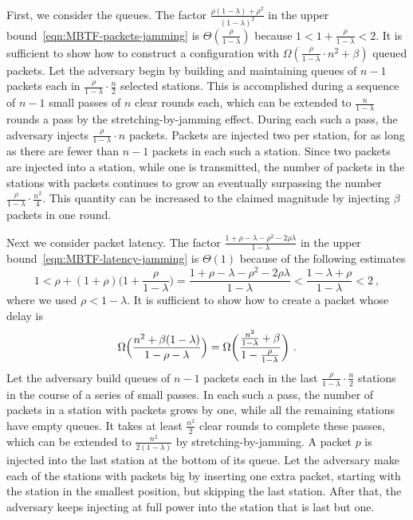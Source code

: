 \documentclass[11pt]{article}
\begin{document}
First, we consider the queues.
The factor $\frac{\rho(1-\lambda)+\rho^2 }{(1-\lambda)^2}$ in the upper bound~\eqref{eqn:MBTF-packets-jamming} is $\Theta(\frac{\rho}{1-\lambda})$ because $1<1+\frac{\rho}{1-\lambda}< 2$.
It is sufficient to show how to construct a configuration with $\Omega(\frac{\rho  }{1-\lambda}\cdot n^2 + \beta)$ queued packets.
Let the adversary begin by building and maintaining queues of $n-1$ packets each in $\frac{\rho}{1-\lambda}\cdot \frac{n}{2}$ selected stations.
This is accomplished during a sequence of $n-1$ small passes of $n$ clear rounds each, which can be extended to $\frac{n}{1-\lambda}$ rounds a pass by the stretching-by-jamming effect.
During each such a pass, the adversary injects $\frac{\rho }{1-\lambda}\cdot n$ packets.
Packets are injected two per station, for as long as there are fewer than $n-1$ packets in each such a station.
Since two packets are injected into a station, while one is transmitted, the number of packets in the stations with packets continues to grow an eventually surpassing the number $\frac{\rho }{1-\lambda}\cdot \frac{n^2}{4}$.
This quantity can be increased to the claimed magnitude by injecting $\beta$ packets in one round.


Next we consider packet latency.
The factor $\frac{1+\rho-\lambda -\rho^2-2\rho\lambda}{1-\lambda}$ in the upper bound~\eqref{eqn:MBTF-latency-jamming} is $\Theta(1)$ because of the following estimates
\[
1
<
\rho+(1+\rho)\bigl(1+\frac{\rho}{1-\lambda}\bigr)
=
\frac{1+\rho-\lambda -\rho^2-2\rho\lambda}{1-\lambda}
<
\frac{1-\lambda +\rho}{1-\lambda} <2
\ ,
\]
where we used $\rho<1-\lambda$.
It is sufficient to show how to create a packet whose delay is  
\[
\Omega\Bigl( \frac{n^2 + \beta(1-\lambda)}{1-\rho-\lambda} \Bigr) = \Omega\biggl(\frac{\frac{n^2}{1-\lambda} + \beta}{1-\frac{\rho}{1-\lambda}}\biggr)
\ .
\]
Let the adversary build queues of $n-1$ packets each in the last  $\frac{\rho}{1-\lambda}\cdot \frac{n}{2}$ stations in the course of a series of small passes.
In each such a pass, the number of packets in a station with packets grows by one, while all the remaining stations have empty queues.
It takes at least $\frac{n^2}{2}$ clear rounds to complete these passes, which can be extended to $\frac{n^2}{2(1-\lambda)}$ by stretching-by-jamming.
A packet $p$ is injected into the last station at the bottom of its queue.
Let the adversary make each of the stations with packets big by inserting one extra packet, starting with the station in the smallest position, but skipping the last station.
After that, the adversary keeps injecting at full power into the station that is last but one.
\end{document}
